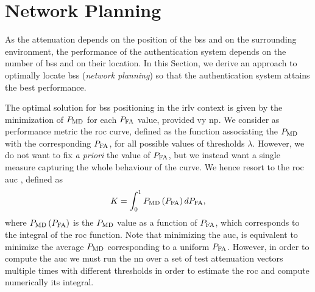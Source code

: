 \documentclass[conference,final]{IEEEtran}
\begin{document}


\section{Network Planning}\label{sec:bsPos}

As the attenuation depends on the position of the \acp{bs} and on the surrounding environment, the performance of the authentication system depends on the number of \acp{bs} and on their location. In this Section, we derive an approach to optimally locate \acp{bs} (\emph{network planning}) so that the authentication system attains the best performance. 


The optimal solution for \acp{bs} positioning in the \ac{irlv} context is given by the minimization of $P_{\rm MD}$ for each $P_{\rm FA}$ value, provided vy \ac{np}. We consider as performance metric the \ac{roc} curve, defined as the  function associating the $P_{\rm MD}$ with the corresponding $P_{\rm FA}$, for all possible values of thresholds $\lambda$. However, we do not want to fix {\em a priori} the value of $P_{\rm FA}$, but we instead want a single measure capturing the whole behaviour of the curve. We hence resort to the \ac{roc} \ac{auc} \cite{hanley-82}, defined as 
\begin{equation}
    K  = \int_{0}^{1} P_{\rm MD}\left(P_{\rm FA}\right) d P_{\rm FA},
\end{equation}
where $P_{\rm MD}\left(P_{\rm FA}\right)$ is the $P_{\rm MD}$ value as a function of $P_{\rm FA}$, which corresponds to the integral of the \ac{roc} function. Note that minimizing the \ac{auc}, is equivalent to minimize the average $P_{\rm MD}$ corresponding to a uniform $P_{\rm FA}$.
However, in order to compute the \ac{auc} we must run the \ac{nn} over a set of test attenuation vectors multiple times with different thresholds in order to estimate the \ac{roc} and compute numerically its integral.
\end{document}
